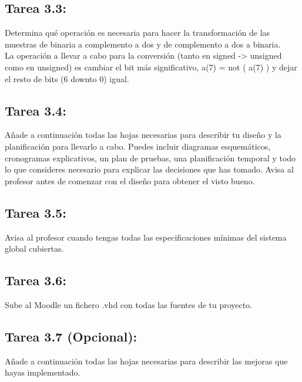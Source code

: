 \documentclass{article}
\begin{document}
\subsection{Tarea 3.3:}
Determina qué operación es necesaria para hacer la transformación de las muestras de binaria a complemento a dos y de complemento a dos a binaria.\\

La operación a llevar a cabo para la conversión (tanto en signed -> unsigned como en unsigned) es cambiar el bit más significativo, a(7) = not ( a(7) ) y dejar el resto de bits (6 downto 0) igual.

\subsection{Tarea 3.4:}
Añade a continuación todas las hojas necesarias para describir tu diseño y la planificación para llevarlo a cabo. Puedes incluir diagramas esquemáticos, cronogramas explicativos, un plan de pruebas, una planificación temporal y todo lo que consideres necesario para explicar las decisiones que has tomado.
Avisa al profesor antes de comenzar con el diseño para obtener el visto bueno.

\subsection{Tarea 3.5:}
Avisa al profesor cuando tengas todas las especificaciones mínimas del sistema global cubiertas.

\subsection{Tarea 3.6:}
Sube al Moodle un fichero .vhd con todas las fuentes de tu proyecto.

\subsection{Tarea 3.7 (Opcional):}
Añade a continuación todas las hojas necesarias para describir las mejoras que hayas implementado.
\end{document}
